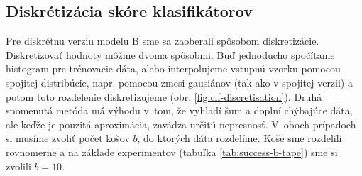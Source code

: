 

\subsection{Diskrétizácia skóre klasifikátorov}

Pre diskrétnu verziu modelu B sme sa zaoberali spôsobom diskretizácie.
Diskretizovať hodnoty môžme dvoma spôsobmi. Buď jednoducho spočítame histogram pre trénovacie dáta, alebo interpolujeme vstupnú vzorku pomocou spojitej distribúcie, napr. pomocou zmesi gausiánov (tak ako v spojitej verzii) a potom toto rozdelenie diskretizujeme (obr. \ref{fig:clf-discretisation}). Druhá spomenutá metóda má výhodu v~tom, že vyhladí šum a doplní chýbajúce dáta, ale keďže je pouzitá aproximácia, zavádza určitú nepresnosť.
V~oboch prípadoch si musíme zvoliť počet košov $b$, do ktorých dáta rozdelíme. Koše sme rozdelili rovnomerne a na základe experimentov (tabuľka \ref{tab:success-b-tape}) sme si zvolili $b = 10$.

